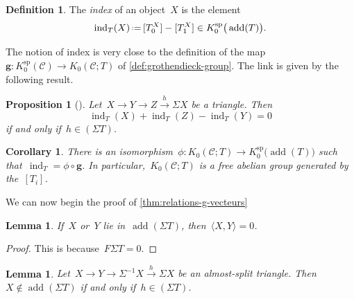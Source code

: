 \documentclass{amsart}
\newtheorem{corollary}[theorem]{Corollary}
\newtheorem{proposition}[theorem]{Proposition}
\newtheorem{lemma}[theorem]{Lemma}
\theoremstyle{definition}
\newtheorem{definition}[theorem]{Definition}
\renewcommand{\b}[1]{{\boldsymbol{#1}}} %
\newcommand{\eqdef}{\mbox{\,\raisebox{0.2ex}{\scriptsize\ensuremath{\mathrm:}}\ensuremath{=}\,}} %
\newcommand{\darkblue}{\color{darkblue}} %
\newcommand{\defn}[1]{\textsl{\darkblue #1}} %
\newcommand{\cat}{\mathcal{C}}
\newcommand{\susp}{\Sigma}
\newcommand{\add}{\operatorname{add}}
\newcommand{\spl}{\operatorname{sp}}
\newcommand{\Ksp}{K_0^{\spl}}
\newcommand{\ind}{\operatorname{ind}}
\begin{document}
\begin{definition}
The \defn{index} of an object~$X$ is the element
\[
\ind_T(X) \eqdef [T_0^X] - [T_1^X] \in \Ksp \big( \add(T) \big).
\]
\end{definition}

The notion of index is very close to the definition of the map~$\b{g}:\Ksp(\cat)\to K_0(\cat ; T)$ of \cref{def:grothendieck-group}. The link is given by the following result.

\begin{proposition}[\cite{Palu}]
Let~$X\xrightarrow{} Y \xrightarrow{} Z \xrightarrow{h} \susp X$ be a triangle.
Then
\[
\ind_T(X) + \ind_T(Z) - \ind_T(Y) = 0
\]
if and only if~$h \in (\susp T)$.
\end{proposition}

\begin{corollary}
\label{coro:grothendieck-g-vectors}
There is an isomorphism~$\phi:K_0(\cat ; T) \to \Ksp \big( \add(T) \big)$ such that~$\ind_T = \phi\circ \b{g}$. In particular,~$K_0(\cat ; T)$ is a free abelian group generated by the~$[T_i]$.
\end{corollary}

We can now begin the proof of \cref{thm:relations-g-vecteurs}

\begin{lemma}
\label{lem:bilinear-form-suspention-T}
If~$X$ or~$Y$ lie in~$\add(\susp T)$, then~$\langle X, Y \rangle = 0$.
\end{lemma}

\begin{proof}
This is because~$F\susp T = 0$.
\end{proof}

\begin{lemma}
\label{lem:almost-split}
Let~$X\xrightarrow{} Y \xrightarrow{} \susp^{-1} X \xrightarrow{h} \susp X$ be an almost-split triangle. Then~$X\notin \add(\susp T)$ if and only if~$h \in (\susp T)$.
\end{lemma}
\end{document}
